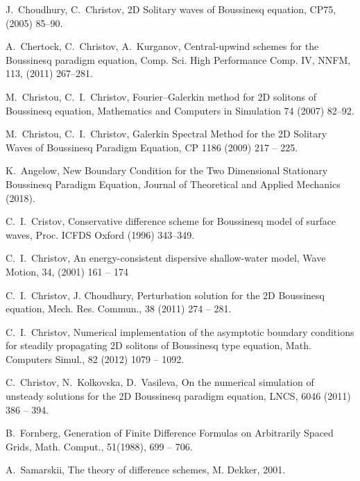 \documentclass[preprint]{elsarticle}
\begin{document}
\begin{thebibliography}{30}

J.~Choudhury, C.~Christov, 2D  Solitary waves of  Boussinesq equation, CP75, (2005) 85–90.

A.~Chertock, C.~Christov, A.~Kurganov, Central-upwind schemes for the  Boussinesq paradigm equation, Comp. Sci. High Performance Comp. IV, NNFM, 113, (2011) 267–281.

M.~Christou, C.~I.~Christov, Fourier–Galerkin method for 2D solitons of Boussinesq equation, 
Mathematics and Computers in Simulation 74 (2007) 82–92.
 
M.~Christou, C.~I.~Christov, Galerkin Spectral Method for the 2D Solitary
Waves of Boussinesq Paradigm Equation, CP 1186 (2009) 217 -- 225.

K.~Angelow, New Boundary Condition for the Two Dimensional Stationary Boussinesq Paradigm Equation, 
Journal of Theoretical and Applied Mechanics (2018).

C.~I.~Cristov, Conservative difference scheme for Boussinesq model of
surface waves, Proc. ICFDS Oxford (1996) 343--349.

C.~I.~Christov, An energy-consistent dispersive shallow-water model,
Wave Motion,  34, (2001) 161 -- 174


C.~I.~Christov, J. Choudhury, Perturbation solution  for the 2D Boussinesq equation,       
Mech. Res. Commun., 38 (2011)  274 -- 281.

C.~I.~Christov,  Numerical implementation of the asymptotic boundary conditions
for steadily propagating 2D solitons of   Boussinesq type equation,       
Math. Computers  Simul., 82 (2012)  1079 -- 1092.

C.~Christov, N.~Kolkovska, D.~Vasileva, On the numerical simulation of unsteady solutions for the 2D Boussinesq paradigm equation, LNCS, 6046  (2011) 386 -- 394.

B.~Fornberg, Generation of Finite Difference Formulas on Arbitrarily Spaced Grids, 
Math. Comput., 51(1988),  699 -- 706.

A.~Samarskii, The theory of difference schemes, M. Dekker,  2001.


\end{thebibliography}
\end{document}
